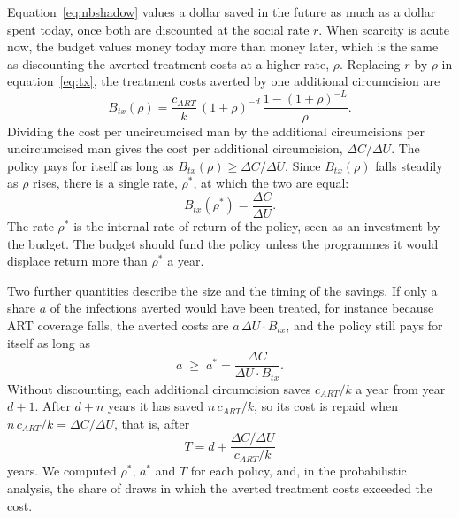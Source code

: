 \documentclass[11pt]{article}
\numberwithin{equation}{section}\numberwithin{figure}{section}\numberwithin{table}{section}
\begin{document}
Equation~\ref{eq:nbshadow} values a dollar saved in the future as much as a dollar spent today, once both are discounted at the social rate $r$. When scarcity is acute now, the budget values money today more than money later, which is the same as discounting the averted treatment costs at a higher rate, $\rho$. Replacing $r$ by $\rho$ in equation~\ref{eq:tx}, the treatment costs averted by one additional circumcision are
\begin{equation}\label{eq:btxrho}
B_{tx}(\rho) = \frac{c_{ART}}{k}\,(1+\rho)^{-d}\,\frac{1 - (1+\rho)^{-L}}{\rho}.
\end{equation}
Dividing the cost per uncircumcised man by the additional circumcisions per uncircumcised man gives the cost per additional circumcision, $\Delta C / \Delta U$. The policy pays for itself as long as $B_{tx}(\rho) \ge \Delta C / \Delta U$. Since $B_{tx}(\rho)$ falls steadily as $\rho$ rises, there is a single rate, $\rho^*$, at which the two are equal:
\begin{equation}\label{eq:irr}
B_{tx}(\rho^*) = \frac{\Delta C}{\Delta U}.
\end{equation}
The rate $\rho^*$ is the internal rate of return of the policy, seen as an investment by the budget. The budget should fund the policy unless the programmes it would displace return more than $\rho^*$ a year.

Two further quantities describe the size and the timing of the savings. If only a share $a$ of the infections averted would have been treated, for instance because ART coverage falls, the averted costs are $a\,\Delta U \cdot B_{tx}$, and the policy still pays for itself as long as
\begin{equation}\label{eq:coverage}
a \;\ge\; a^* = \frac{\Delta C}{\Delta U \cdot B_{tx}}.
\end{equation}
Without discounting, each additional circumcision saves $c_{ART}/k$ a year from year $d+1$. After $d+n$ years it has saved $n\,c_{ART}/k$, so its cost is repaid when $n\,c_{ART}/k = \Delta C/\Delta U$, that is, after
\begin{equation}\label{eq:payback}
T = d + \frac{\Delta C / \Delta U}{c_{ART}/k}
\end{equation}
years. We computed $\rho^*$, $a^*$ and $T$ for each policy, and, in the probabilistic analysis, the share of draws in which the averted treatment costs exceeded the cost.
\end{document}
